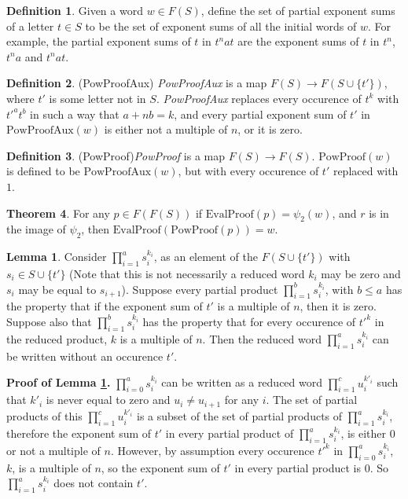 \documentclass[11pt]{article} %
\theoremstyle{definition}
\newtheorem{theorem}{Theorem}[section]
\theoremstyle{definition}
\theoremstyle{definition}
\theoremstyle{definition}
\newtheorem{sublemma}{Lemma}[theorem]
\theoremstyle{definition}
\newtheorem{defn}[theorem]{Definition}
\theoremstyle{definition}
\begin{document}
\begin{defn}
  Given a word $w \in F(S)$, define the set of partial exponent sums of a letter $t \in S$ to
  be the set of exponent sums of all the initial words of $w$. For example, the partial
  exponent sums of $t$ in $t^n a t$ are the exponent sums of $t$ in
  $t^n$, $t^na$ and $t^nat$.
\end{defn}

\begin{defn}(PowProofAux)
  \textit{PowProofAux} is a map $F(S) \to F(S \cup \{t'\})$, where $t'$ is some letter not in $S$.
  \textit{PowProofAux} replaces every occurence of $t^k$ with $t'^at^b$ in such a way that $a + n b = k$,
  and every partial exponent sum of $t'$ in $\text{PowProofAux}(w)$ is either not a multiple of $n$,
  or it is zero.
\end{defn}

\begin{defn}(PowProof)\label{PowProof}
  \textit{PowProof} is a map $F(S) \to F(S)$. $\text{PowProof}(w)$ is defined to be
  $\text{PowProofAux}(w)$, but with every occurence of $t'$ replaced with $1$.
\end{defn}

\begin{theorem}\label{powproof}
  For any $p \in F(F(S))$ if $\text{EvalProof}(p) = \psi_2(w)$, and $r$ is
  in the image of $\psi_2$, then $\text{EvalProof}(\text{PowProof}(p)) = w$.
\end{theorem}

\begin{sublemma}\label{powproof1}
  Consider $\prod_{i = 1}^a s_i^{k_i}$, as an element of the $F(S \cup \{t'\})$
  with $s_i \in S \cup \{t'\}$ (Note that this is not necessarily a reduced
  word $k_i$ may be zero and $s_i$ may be equal to $s_{i+1}$).
  Suppose every partial product $\prod_{i=1}^b s_i^{k_i}$,
  with $b \le a$ has the property that if the exponent sum of $t'$ is a multiple
  of $n$, then it is zero. Suppose also that $\prod_{i = 1}^b s_i^{k_i}$ has the
  property that for every occurence of $t'^k$ in the reduced product, $k$ is a multiple of
  $n$. Then the reduced word $\prod_{i = 1}^a s_i^{k_i}$
  can be written without an occurence $t'$.
\end{sublemma}

\textbf{Proof of Lemma \ref{powproof1}.} $\prod_{i=0}^a s_i^{k_i}$ can be written as a reduced
word $\prod_{i = 1}^{c} u_i^{k'_i}$ such that $k'_i$ is never equal to zero and
$u_i \ne u_{i+1}$ for any $i$. The set of partial products of this
$\prod_{i = 1}^{c} u_i^{k'_i}$ is a subset of the set of partial products of $\prod_{i=1}^a s_i^{k_i}$,
therefore the exponent sum of $t'$ in every partial product of $\prod_{i=1}^a s_i^{k_i}$, is
either $0$ or not a multiple of $n$. However, by assumption every occurence $t'^k$ in
$\prod_{i=0}^a s_i^{k_i}$, $k$, is a multiple of $n$, so the exponent sum of $t'$ in every
partial product is $0$. So $\prod_{i=1}^a s_i^{k_i}$ does not contain $t'$.
\end{document}
